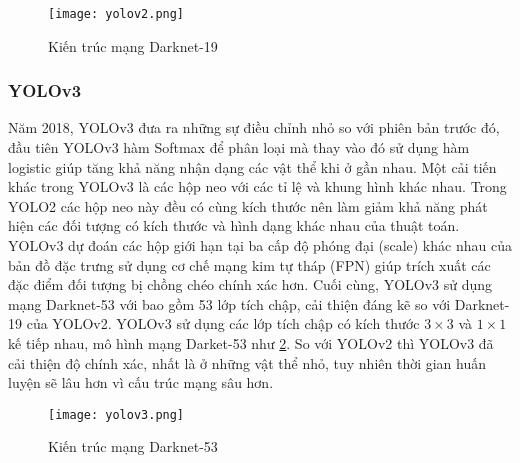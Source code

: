 \documentclass[../the.tex]{subfiles}
\begin{document}
\begin{figure}[H]
	\centering
	\texttt{[image: yolov2.png]}
	\caption{Kiến trúc mạng Darknet-19 \cite{redmon2016yolo9000}}
	\label{fig:yolov2}
\end{figure}
\bigskip

\subsubsection{YOLOv3}
{\fontsize{13}{12} \selectfont

	Năm 2018, YOLOv3 \cite{redmon2018yolov3} đưa ra những sự điều chỉnh nhỏ so với phiên bản trước đó, đầu tiên YOLOv3 hàm Softmax để phân loại mà thay vào đó sử dụng
	hàm logistic giúp tăng khả năng nhận dạng các vật thể khi ở gần nhau. Một cải tiến khác trong YOLOv3 là các hộp neo với các tỉ lệ và khung hình khác nhau. Trong YOLO2 các hộp neo này đều có cùng kích thước
	nên làm giảm khả năng phát hiện các đối tượng có kích thước và hình dạng khác nhau của thuật toán. YOLOv3 dự đoán các hộp giới hạn tại ba cấp độ phóng đại (scale) khác nhau của bản đồ đặc trưng sử dụng cơ chế mạng kim tự tháp (FPN)  \cite{lin2017feature}
	giúp trích xuất các đặc điểm đối tượng bị chồng chéo chính xác hơn. Cuối cùng, YOLOv3 sử dụng mạng Darknet-53 với bao gồm 53 lớp tích chập, cải thiện đáng kẽ so với Darknet-19 của YOLOv2.
	YOLOv3 sử dụng các lớp tích chập có kích thước $3 \times 3 $ và $1 \times 1$ kế tiếp nhau, mô hình mạng Darket-53 như \ref{fig:yolov3}. So với YOLOv2 thì YOLOv3 đã cải thiện độ chính xác, nhất là ở những vật thể nhỏ, tuy nhiên thời gian huấn luyện sẽ lâu hơn vì cấu trúc mạng sâu hơn.

}

\begin{figure}[H]
	\centering
	\texttt{[image: yolov3.png]}
	\caption{Kiến trúc mạng Darknet-53 \cite{redmon2018yolov3}}
	\label{fig:yolov3}
\end{figure}
\bigskip
\end{document}
